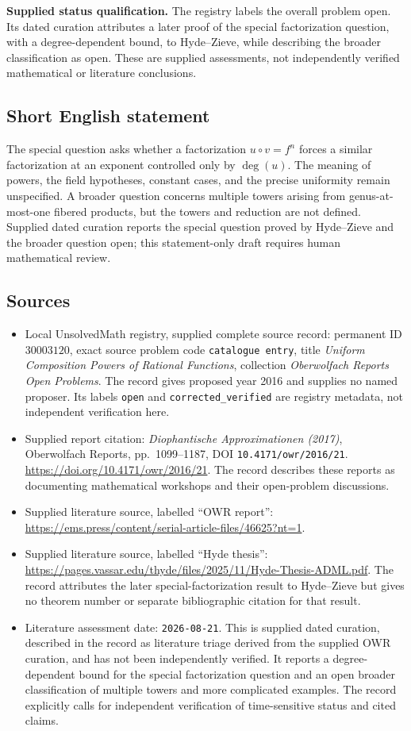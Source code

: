 \documentclass[11pt]{article}
\begin{document}
\textbf{Supplied status qualification.} The registry labels the overall problem open. Its dated curation attributes a later proof of the special factorization question, with a degree-dependent bound, to Hyde--Zieve, while describing the broader classification as open. These are supplied assessments, not independently verified mathematical or literature conclusions.
\subsection{Short English statement}
The special question asks whether a factorization \(u\circ v=f^n\) forces a similar factorization at an exponent controlled only by \(\deg(u)\). The meaning of powers, the field hypotheses, constant cases, and the precise uniformity remain unspecified. A broader question concerns multiple towers arising from genus-at-most-one fibered products, but the towers and reduction are not defined. Supplied dated curation reports the special question proved by Hyde--Zieve and the broader question open; this statement-only draft requires human mathematical review.
\subsection{Sources}
\begin{itemize}
\item Local UnsolvedMath registry, supplied complete source record: permanent ID \(30003120\), exact source problem code \texttt{catalogue entry}, title \emph{Uniform Composition Powers of Rational Functions}, collection \emph{Oberwolfach Reports Open Problems}. The record gives proposed year 2016 and supplies no named proposer. Its labels \texttt{open} and \texttt{corrected\_verified} are registry metadata, not independent verification here.
\item Supplied report citation: \emph{Diophantische Approximationen (2017)}, Oberwolfach Reports, pp.\ 1099--1187, DOI \texttt{10.4171/owr/2016/21}. \url{https://doi.org/10.4171/owr/2016/21}. The record describes these reports as documenting mathematical workshops and their open-problem discussions.
\item Supplied literature source, labelled ``OWR report'': \url{https://ems.press/content/serial-article-files/46625?nt=1}.
\item Supplied literature source, labelled ``Hyde thesis'': \url{https://pages.vassar.edu/thyde/files/2025/11/Hyde-Thesis-ADML.pdf}. The record attributes the later special-factorization result to Hyde--Zieve but gives no theorem number or separate bibliographic citation for that result.
\item Literature assessment date: \texttt{2026-08-21}. This is supplied dated curation, described in the record as literature triage derived from the supplied OWR curation, and has not been independently verified. It reports a degree-dependent bound for the special factorization question and an open broader classification of multiple towers and more complicated examples. The record explicitly calls for independent verification of time-sensitive status and cited claims.
\end{itemize}
\end{document}
